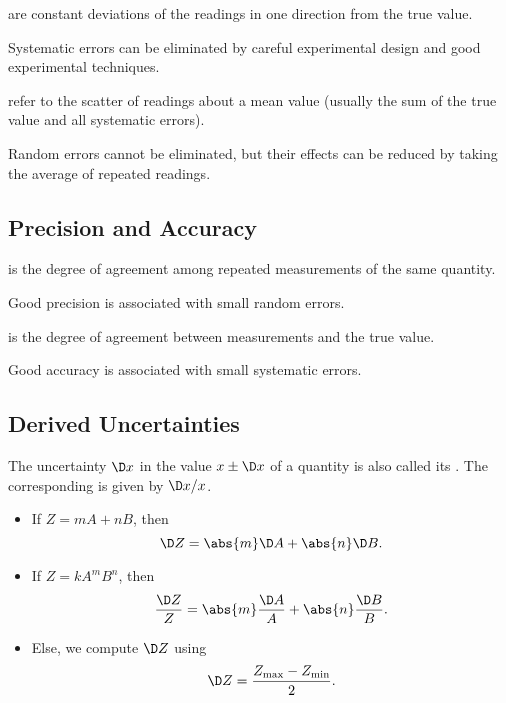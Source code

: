 \begin{definition}
     are constant deviations of the readings in one direction from the true value.
\end{definition}

Systematic errors can be eliminated by careful experimental design and good experimental techniques.

\begin{definition}
     refer to the scatter of readings about a mean value (usually the sum of the true value and all systematic errors).
\end{definition}

Random errors cannot be eliminated, but their effects can be reduced by taking the average of repeated readings.

\subsection{Precision and Accuracy}

\begin{definition}
     is the degree of agreement among repeated measurements of the same quantity.
\end{definition}

Good precision is associated with small random errors.

\begin{definition}
     is the degree of agreement between measurements and the true value.
\end{definition}

Good accuracy is associated with small systematic errors.

\subsection{Derived Uncertainties}

\begin{definition}
    The uncertainty $\D x$ in the value $x \pm \D x$ of a quantity is also called its . The corresponding  is given by $\D x / x$.
\end{definition}

\begin{itemize}
    \item If $Z = m A + n B$, then \[\D Z = \abs{m} \D A + \abs{n} \D B.\]
    \item If $Z = k A^m B^n$, then \[\frac{\D Z}{Z} = \abs{m} \frac{\D A}{A} + \abs{n} \frac{\D B}{B}.\]
    \item Else, we compute $\D Z$ using \[\D Z = \frac{Z_{\text{max}} - Z_{\text{min}}}{2}.\]
\end{itemize}